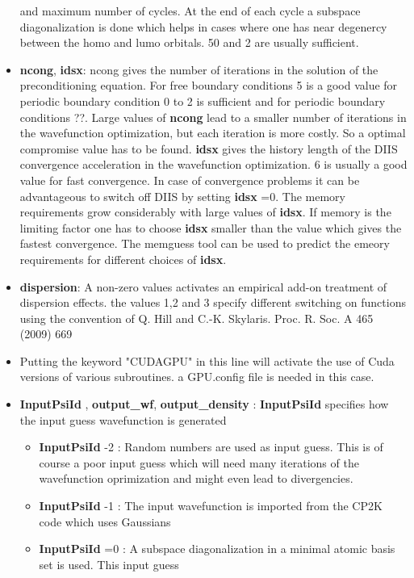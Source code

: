 \documentclass[a4paper,11pt]{report}
\begin{document}
\begin{itemize}
      and maximum number of cycles. At the end of each cycle a subspace diagonalization is done which helps 
in cases where one has near degenercy between the homo and lumo orbitals. 50 and 2 are usually sufficient.
\item {\bf ncong}, {\bf idsx}: ncong gives the number of iterations in the solution of the preconditioning equation.
      For free boundary conditions 5 is a good value for periodic boundary condition 0 to 2 is sufficient and for 
      periodic boundary conditions ??. Large values of {\bf ncong} lead to a smaller number of iterations in 
      the wavefunction optimization, but each iteration is more costly. So a optimal compromise value has to be found.
      {\bf idsx} gives the history length of the DIIS convergence acceleration in the wavefunction optimization.
      6 is usually a good value for fast convergence. In case of convergence problems it can be advantageous 
      to switch off DIIS by setting {\bf idsx} =0. The memory requirements grow considerably with large values of 
      {\bf idsx}. If memory is the limiting factor one has to choose {\bf idsx} smaller than the value which gives 
      the fastest convergence. The memguess tool can be used to predict the emeory requirements for different choices 
      of  {\bf idsx}.
\item {\bf dispersion}:  A non-zero values activates an  empirical add-on treatment of dispersion effects.
       the values 1,2 and 3 specify different switching on functions using the convention of 
       Q. Hill and C.-K. Skylaris.  Proc. R. Soc. A 465  (2009) 669
\item  Putting the keyword "CUDAGPU" in this line will activate the use of Cuda versions of various subroutines.
       a GPU.config file is needed in this case. 
\item {\bf InputPsiId }, {\bf  output\_wf},  {\bf output\_density }: 
       {\bf InputPsiId } specifies how the input guess wavefunction is generated
      \begin{itemize}
       \item {\bf InputPsiId } -2 : Random numbers are used as input guess. This is of course a poor input guess which will 
                                    need many iterations of the wavefunction oprimization and might even lead to divergencies.
       \item {\bf InputPsiId } -1 : The input wavefunction is imported from the CP2K code which uses Gaussians
       \item {\bf InputPsiId } =0 : A subspace diagonalization in a minimal atomic basis set is used. This input guess 

\end{itemize}
\end{itemize}
\end{document}
